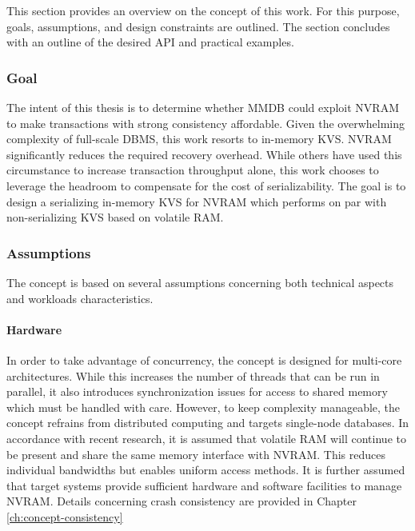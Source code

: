 This section provides an overview on the concept of this work. For this purpose,
goals, assumptions, and design constraints are outlined. The section concludes
with an outline of the desired \ac{API} and practical examples.

\subsubsection{Goal}

The intent of this thesis is to determine whether \ac{MMDB} could exploit
\ac{NVRAM} to make transactions with strong consistency affordable. Given the
overwhelming complexity of full-scale \ac{DBMS}, this work resorts to in-memory
\ac{KVS}. \ac{NVRAM} significantly reduces the required recovery overhead. While
others have used this circumstance to increase transaction throughput alone,
this work chooses to leverage the headroom to compensate for the cost of
serializability. The goal is to design a serializing in-memory \ac{KVS} for
\ac{NVRAM} which performs on par with non-serializing \ac{KVS} based on volatile
\ac{RAM}.

\subsubsection{Assumptions}

The concept is based on several assumptions concerning both technical aspects
and workloads characteristics.

\paragraph{Hardware}

In order to take advantage of concurrency, the concept is designed for
multi-core architectures. While this increases the number of threads that can be
run in parallel, it also introduces synchronization issues for access to shared
memory which must be handled with care. However, to keep complexity manageable,
the concept refrains from distributed computing and targets single-node
databases. In accordance with recent research, it is assumed that volatile
\ac{RAM} will continue to be present and share the same memory interface with
\ac{NVRAM}. This reduces individual bandwidths but enables uniform access
methods. It is further assumed that target systems provide sufficient hardware
and software facilities to manage \ac{NVRAM}. Details concerning crash
consistency are provided in Chapter \ref{ch:concept-consistency}

